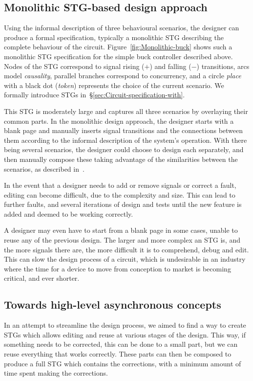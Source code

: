 \documentclass[british,compsoc]{IEEEtran}
\begin{document}
\subsection{Monolithic STG-based design approach\label{sub:Monolithic}}

Using the informal description of three behavioural scenarios, the designer can
produce a formal specification, typically a monolithic STG describing the
complete behaviour of the circuit. Figure~\ref{fig:Monolithic-buck} shows such
a monolithic STG specification for the simple buck controller described above.
Nodes of the STG correspond to signal rising ($+$) and falling ($-$) transitions,
arcs model \emph{causality}, parallel branches correspond to concurrency, and
a circle \emph{place} with a black dot (\emph{token}) represents the choice of
the current scenario. We formally introduce STGs
in~\S\ref{sec:Circuit-specification-with}.

This STG is moderately large and captures all three scenarios by overlaying
their common parts. In the monolithic design approach, the designer starts with
a blank page and manually inserts signal transitions and the connections between
them according to the informal description of the system's operation. With
there being several scenarios, the designer could choose to design each
separately, and then manually compose these taking advantage of the
similarities between the scenarios, as described
in~\cite{2014_sokolov_ftfc}\cite{sokolov2015design}.

In the event that a designer needs to add or remove signals or correct a fault,
editing can become difficult, due to the complexity and size. This can lead to
further faults, and several iterations of design and tests until the new
feature is added and deemed to be working correctly.

A designer may even have to start from a blank page in some cases, unable to
reuse any of the previous design. The larger and more complex an STG is, and
the more signals there are, the more difficult it is to comprehend,
debug and edit. This can slow the design process of a circuit, which is
undesirable in an industry where the time for a device to move from conception
to market is becoming critical, and ever shorter.

\vspace{-2mm}
\subsection{Towards high-level asynchronous concepts\label{sub:new-way}}
In an attempt to streamline the design process, we aimed to find a way to
create STGs which allows editing and reuse at various stages of the design.
This way, if something needs to be corrected, this can be done to a small part,
but we can reuse everything that works correctly. These parts can then be
composed to produce a full STG which contains the corrections, with a minimum
amount of time spent making the corrections.
\end{document}
